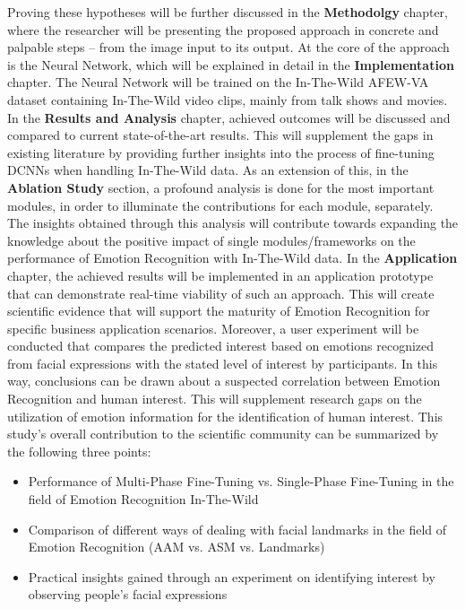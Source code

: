 Proving these hypotheses will be further discussed in the \textbf{Methodolgy} chapter, where the researcher will be presenting the proposed approach in concrete and palpable steps -- from the image input to its output. At the core of the approach is the Neural Network, which will be explained in detail in the \textbf{Implementation} chapter. The Neural Network will be trained on the In-The-Wild AFEW-VA dataset containing In-The-Wild video clips, mainly from talk shows and movies.
\newline\newline
In the \textbf{Results and Analysis} chapter, achieved outcomes will be discussed and compared to current state-of-the-art results. This will supplement the gaps in existing literature by providing further insights into the process of fine-tuning DCNNs when handling In-The-Wild data. As an extension of this, in the \textbf{Ablation Study} section, a profound analysis is done for the most important modules, in order to illuminate the contributions for each module, separately. The insights obtained through this analysis will contribute towards expanding the knowledge about the positive impact of single modules/frameworks on the performance of Emotion Recognition with In-The-Wild data.
\newline\newline
In the \textbf{Application} chapter, the achieved results will be implemented in an application prototype that can demonstrate real-time viability of such an approach. This will create scientific evidence that will support the maturity of Emotion Recognition for specific business application scenarios.\newline
Moreover, a user experiment will be conducted that compares the predicted interest based on emotions recognized from facial expressions with the stated level of interest by participants. In this way, conclusions can be drawn about a suspected correlation between Emotion Recognition and human interest. This will supplement research gaps on the utilization of emotion information for the identification of human interest. 
\newline\newline
This study's overall contribution to the scientific community can be summarized by the following three points:
\begin{itemize}
    \item Performance of Multi-Phase Fine-Tuning vs. Single-Phase Fine-Tuning in the field of Emotion Recognition In-The-Wild
    \item Comparison of different ways of dealing with facial landmarks in the field of Emotion Recognition (AAM vs. ASM vs. Landmarks)
    \item Practical insights gained through an experiment on identifying interest by observing people's facial expressions
\end{itemize}